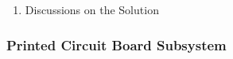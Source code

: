 \documentclass[a4paper,12pt]{article}
\begin{document}
\begin{enumerate}













\item {Discussions on the Solution}


\end{enumerate}





\subsubsection{Printed Circuit Board Subsystem}
\end{document}
